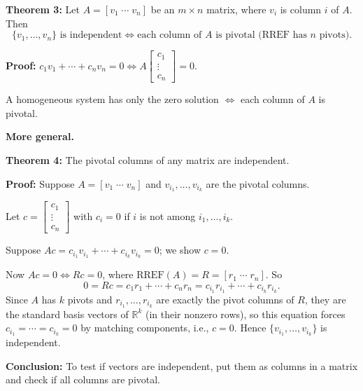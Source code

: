 \documentclass{article}
\begin{document}
\textbf{Theorem 3:} Let $A = [v_1 \; \cdots \; v_n]$ be an $m \times n$ matrix, where $v_i$ is column $i$ of $A$. Then
\[
\{v_1, \ldots, v_n\} \text{ is independent} \iff \text{each column of } A \text{ is pivotal (RREF has } n \text{ pivots)}.
\]

\medskip

\textbf{Proof:} $c_1 v_1 + \cdots + c_n v_n = 0 \iff A \begin{bmatrix} c_1 \\ \vdots \\ c_n \end{bmatrix} = 0$.

\newpage

A homogeneous system has only the zero solution $\iff$ each column of $A$ is pivotal.

\bigskip

\textbf{More general.}

\medskip

\textbf{Theorem 4:} The pivotal columns of any matrix are independent.

\medskip

\textbf{Proof:} Suppose $A = [v_1 \; \cdots \; v_n]$ and $v_{i_1}, \ldots, v_{i_k}$ are the pivotal columns.

\medskip

Let $c = \begin{bmatrix} c_1 \\ \vdots \\ c_n \end{bmatrix}$ with $c_i = 0$ if $i$ is not among $i_1, \ldots, i_k$.

\medskip

Suppose $Ac = c_{i_1} v_{i_1} + \cdots + c_{i_k} v_{i_k} = 0$; we show $c = 0$.

\medskip

Now $Ac = 0 \iff Rc = 0$, where $\mathrm{RREF}(A) = R = [r_1 \; \cdots \; r_n]$. So
\[
0 = Rc = c_1 r_1 + \cdots + c_n r_n = c_{i_1} r_{i_1} + \cdots + c_{i_k} r_{i_k}.
\]
Since $A$ has $k$ pivots and $r_{i_1}, \ldots, r_{i_k}$ are exactly the pivot columns of $R$, they are the standard basis vectors of $\mathbb{R}^k$ (in their nonzero rows), so this equation forces $c_{i_1} = \cdots = c_{i_k} = 0$ by matching components, i.e., $c = 0$. Hence $\{v_{i_1}, \ldots, v_{i_k}\}$ is independent.

\bigskip

\textbf{Conclusion:} To test if vectors are independent, put them as columns in a matrix and check if all columns are pivotal.
\end{document}
